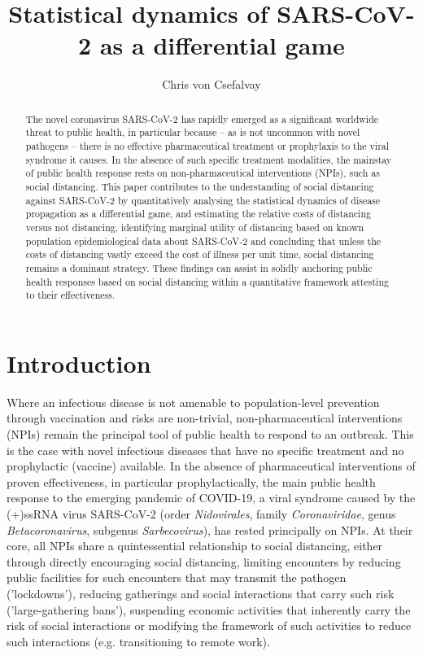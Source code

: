 \documentclass{article}
\title{Statistical dynamics of SARS-CoV-2 as a differential game}
\author{Chris von Csefalvay}
\begin{document}
\maketitle

\begin{abstract}
    The novel coronavirus SARS-CoV-2 has rapidly emerged as a significant worldwide threat to public health, in particular because -- as is not uncommon with novel pathogens -- there is no effective pharmaceutical treatment or prophylaxis to the viral syndrome it causes. In the absence of such specific treatment modalities, the mainstay of public health response rests on non-pharmaceutical interventions (NPIs), such as social distancing. This paper contributes to the understanding of social distancing against SARS-CoV-2 by quantitatively analysing the statistical dynamics of disease propagation as a differential game, and estimating the relative costs of distancing versus not distancing, identifying marginal utility of distancing based on known population epidemiological data about SARS-CoV-2 and concluding that unless the costs of distancing vastly exceed the cost of illness per unit time, social distancing remains a dominant strategy. These findings can assist in solidly anchoring public health responses based on social distancing within a quantitative framework attesting to their effectiveness.
\end{abstract}

\section{Introduction} %
\label{sec:introduction}
Where an infectious disease is not amenable to population-level prevention through vaccination and risks are non-trivial, non-pharmaceutical interventions (NPIs) remain the principal tool of public health to respond to an outbreak. This is the case with novel infectious diseases that have no specific treatment and no prophylactic (vaccine) available. In the absence of pharmaceutical interventions of proven effectiveness, in particular prophylactically, the main public health response to the emerging pandemic of COVID-19, a viral syndrome caused by the (+)ssRNA virus SARS-CoV-2 (order \emph{Nidovirales}, family \emph{Coronaviridae}, genus \emph{Betacoronavirus}, subgenus \emph{Sarbecovirus}), has rested principally on NPIs.\cite{mccoy2020can,lai2020effect,flaxman2020report,ferguson2020report} At their core, all NPIs share a quintessential relationship to social distancing, either through directly encouraging social distancing, limiting encounters by reducing public facilities for such encounters that may transmit the pathogen ('lockdowns'), reducing gatherings and social interactions that carry such risk ('large-gathering bans'), suspending economic activities that inherently carry the risk of social interactions or modifying the framework of such activities to reduce such interactions (e.g. transitioning to remote work).
\end{document}

